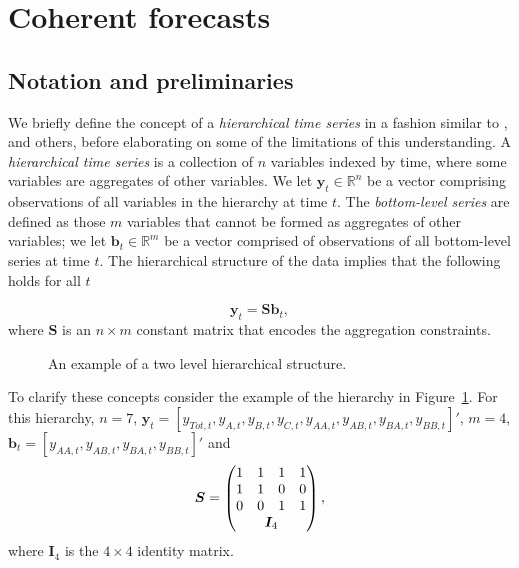 \documentclass[12pt]{article}
\theoremstyle{definition}
\theoremstyle{property}
\begin{document}
\section{Coherent forecasts}\label{sec:CoheForecasts}
	
	\subsection{Notation and preliminaries}\label{sec:notation}
	
    We briefly define the concept of a \emph{hierarchical time series} in a fashion similar to \cite{Wickramasuriya2017}, \cite{FPP2018} and others, before elaborating on some of the limitations of this understanding.  A \emph{hierarchical time series} is a collection of $n$ variables indexed by time, where some variables are aggregates of other variables. We let $\bm{y}_t \in \mathbb{R}^n$ be a vector comprising observations of all variables in the hierarchy at time $t$. The \emph{bottom-level series} are defined as those $m$ variables that cannot be formed as aggregates of other variables; we let $\bm{b}_t \in \mathbb{R}^m$ be a vector comprised of observations of all bottom-level series at time $t$.  The hierarchical structure of the data implies that the following holds for all $t$
    
    \begin{equation}
    \bm{y}_t = \bm{Sb}_t,
    \end{equation}
    where $\bm{S}$ is an $n \times m$ constant matrix that encodes the aggregation constraints.  
	
		\begin{figure}[H]
			\begin{center}
				 
				 
				\qobitree
			\end{center}
			\caption{An example of a two level hierarchical structure.}\label{fig:basichier}
		\end{figure}
	
	To clarify these concepts consider the example of the hierarchy in Figure~\ref{fig:basichier}.  For this hierarchy, $n=7$, $\bm{y}_t = [y_{Tot,t},y_{A,t}, y_{B,t},y_{C,t},y_{AA,t}, y_{AB,t}, y_{BA,t}, y_{BB,t}]'$, $m=4$, $\bm{b}_t = [y_{AA,t}, y_{AB,t}, y_{BA,t}, y_{BB,t}]'$ and
	\[
	\bm{S} = \begin{pmatrix}
	1 & 1 & 1 & 1  \\
	1 & 1 & 0 & 0 \\
	0 & 0 & 1 & 1 \\
	& \multicolumn{2}{c}{\bm{I}_4} &
	\end{pmatrix},
	\]
	where $\bm{I}_4$ is the $4\times 4$ identity matrix.
	
\end{document}
